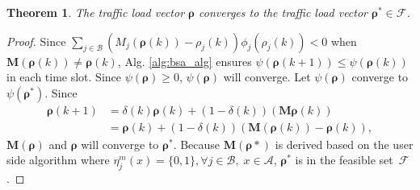\documentclass[journal]{IEEEtran}
\newtheorem{theorem}{Theorem}
\theoremstyle{definition}
\begin{document}
\begin{theorem}
\label{thm:alg_converge_thm}
The traffic load vector $\boldsymbol{\rho}$ converges to the traffic load vector $\boldsymbol{\rho}^{*}\in \mathcal{F}$.
\end{theorem}
\begin{proof}
\label{prf:alg_converge_thm}
Since $\sum_{j\in\mathcal{B}}(M_{j}(\boldsymbol{\rho}(k))-\rho_{j}(k))\phi_{j}(\rho_{j}(k))<0 $ when $\boldsymbol{M}(\boldsymbol{\rho}(k)) \neq \boldsymbol{\rho}(k)$, Alg. \ref{alg:bsa_alg} ensures $\psi(\boldsymbol{\rho}(k+1))\leq\psi(\boldsymbol{\rho}(k))$ in each time slot. Since $\psi(\boldsymbol{\rho})\geq 0$, $\psi(\boldsymbol{\rho})$ will converge. Let $\psi(\boldsymbol{\rho})$ converge to $\psi(\boldsymbol{\rho}^{*})$. Since
\begin{align}
\label{eq:alg_opt_1}
\boldsymbol{\rho}(k+1)&=\delta(k)\boldsymbol{\rho}(k)+(1-\delta(k))(\boldsymbol{M}\boldsymbol{\rho}(k)) \nonumber\\
&=\boldsymbol{\rho}(k) + (1-\delta(k))(\boldsymbol{M}(\boldsymbol{\rho}(k))-\boldsymbol{\rho}(k)),
\end{align}
$\boldsymbol{M}(\boldsymbol{\rho})$ and $\boldsymbol{\rho}$ will converge to $\boldsymbol{\rho}^{*}$. Because $\boldsymbol{M}(\boldsymbol{\rho}{*})$ is derived based on the user side algorithm where $\eta^{m}_{j}(x)=\{0,1\}, \forall j\in\mathcal{B},\; x\in\mathcal{A}$, $\boldsymbol{\rho}^{*}$ is in the feasible set~$\mathcal{F}$.
\end{proof}
\end{document}
